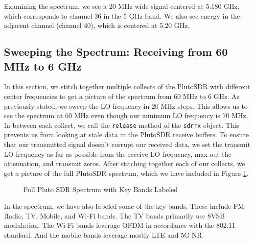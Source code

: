 \documentclass{article}
\begin{document}
Examining the spectrum, we see a 20 MHz wide signal centered at 5.180 GHz, which corresponds to channel 36 in the 5 GHz band. We also see energy in the adjacent channel (channel 40), which is centered at 5.20 GHz.

\subsection{Sweeping the Spectrum: Receiving from 60 MHz to 6 GHz}

In this section, we stitch together multiple collects of the PlutoSDR with different center frequencies to get a picture of the spectrum from 60 MHz to 6 GHz. As previously stated, we sweep the LO frequency in 20 MHz steps. This allows us to see the spectrum at 60 MHz even though our minimum LO frequency is 70 MHz. In between each collect, we call the \texttt{release} method of the \texttt{sdrrx} object. This prevents us from looking at stale data in the PlutoSDR receive buffers. To ensure that our transmitted signal doesn't corrupt our received data, we set the transmit LO frequency as far as possible from the receive LO frequency, max-out the attenuation, and transmit zeros. After stitching together each of our collects, we get a picture of the full PlutoSDR spectrum, which we have included in Figure \ref{fig::full_spectrum_labeled}.

\begin{figure}[H]
	\centerline{}
	\caption{Full Pluto SDR Spectrum with Key Bands Labeled}
	\label{fig::full_spectrum_labeled}
\end{figure}

In the spectrum, we have also labeled some of the key bands. These include FM Radio, TV, Mobile, and Wi-Fi bands. The TV bands primarily use 8VSB modulation. The Wi-Fi bands leverage OFDM in accordance with the 802.11 standard. And the mobile bands leverage mostly LTE and 5G NR.
\end{document}
